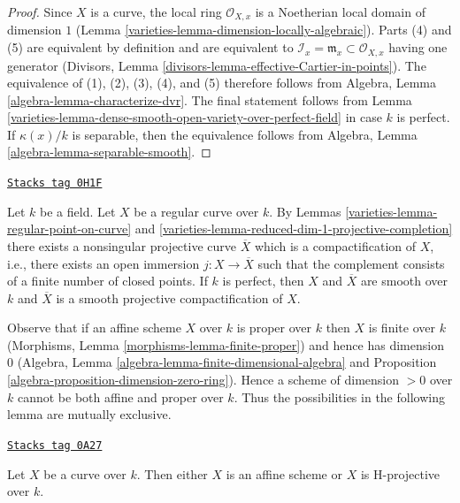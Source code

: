 \begin{proof}

Since $X$ is a curve, the local ring $\mathcal{O}_{X, x}$ is a Noetherian
local domain of dimension $1$ (Lemma \ref{varieties-lemma-dimension-locally-algebraic}).
Parts (4) and (5) are equivalent by definition and are equivalent to
$\mathcal{I}_x = \mathfrak m_x \subset \mathcal{O}_{X, x}$ having one generator
(Divisors, Lemma \ref{divisors-lemma-effective-Cartier-in-points}).
The equivalence of (1), (2), (3), (4), and (5) therefore follows from
Algebra, Lemma \ref{algebra-lemma-characterize-dvr}. The final statement
follows from Lemma \ref{varieties-lemma-dense-smooth-open-variety-over-perfect-field}
in case $k$ is perfect. If $\kappa(x)/k$ is separable, then the equivalence
follows from Algebra, Lemma \ref{algebra-lemma-separable-smooth}.
\end{proof}

\begin{remark}
\label{varieties-remark-smooth-projective-compactification}
\href{https://stacks.math.columbia.edu/tag/0H1F}{\texttt{Stacks tag 0H1F}}

Let $k$ be a field. Let $X$ be a regular curve over $k$. By
Lemmas \ref{varieties-lemma-regular-point-on-curve} and
\ref{varieties-lemma-reduced-dim-1-projective-completion}
there exists a nonsingular projective curve $\overline{X}$
which is a compactification of $X$, i.e., there exists an
open immersion $j : X \to \overline{X}$ such that the complement
consists of a finite number of closed points. If $k$ is perfect,
then $X$ and $\overline{X}$ are smooth over $k$ and
$\overline{X}$ is a smooth projective compactification of $X$.
\end{remark}

Observe that if an affine scheme $X$ over $k$ is proper over $k$
then $X$ is finite over $k$ (Morphisms, Lemma
\ref{morphisms-lemma-finite-proper}) and hence has
dimension $0$
(Algebra, Lemma \ref{algebra-lemma-finite-dimensional-algebra} and
Proposition \ref{algebra-proposition-dimension-zero-ring}).
Hence a scheme of dimension $> 0$ over $k$ cannot be both affine and
proper over $k$. Thus the possibilities in the following lemma are
mutually exclusive.

\begin{lemma}
\label{varieties-lemma-curve-affine-projective}
\href{https://stacks.math.columbia.edu/tag/0A27}{\texttt{Stacks tag 0A27}}

Let $X$ be a curve over $k$. Then either $X$ is an affine scheme or $X$
is H-projective over $k$.
\end{lemma}

